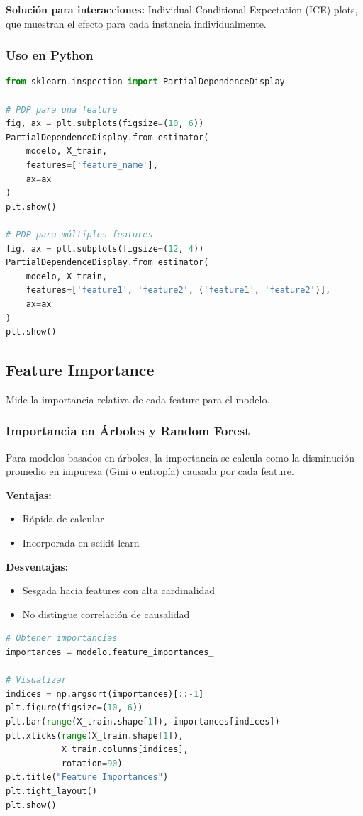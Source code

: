 \documentclass[11pt,a4paper]{article}
\begin{document}
\textbf{Solución para interacciones:} Individual Conditional Expectation (ICE) plots, que muestran el efecto para cada instancia individualmente.

\subsubsection{Uso en Python}

\begin{lstlisting}[language=Python]
from sklearn.inspection import PartialDependenceDisplay

# PDP para una feature
fig, ax = plt.subplots(figsize=(10, 6))
PartialDependenceDisplay.from_estimator(
    modelo, X_train, 
    features=['feature_name'],
    ax=ax
)
plt.show()

# PDP para múltiples features
fig, ax = plt.subplots(figsize=(12, 4))
PartialDependenceDisplay.from_estimator(
    modelo, X_train, 
    features=['feature1', 'feature2', ('feature1', 'feature2')],
    ax=ax
)
plt.show()
\end{lstlisting}

\subsection{Feature Importance}

Mide la importancia relativa de cada feature para el modelo.

\subsubsection{Importancia en Árboles y Random Forest}

Para modelos basados en árboles, la importancia se calcula como la disminución promedio en impureza (Gini o entropía) causada por cada feature.

\textbf{Ventajas:}
\begin{itemize}
\item Rápida de calcular
\item Incorporada en scikit-learn
\end{itemize}

\textbf{Desventajas:}
\begin{itemize}
\item Sesgada hacia features con alta cardinalidad
\item No distingue correlación de causalidad
\end{itemize}

\begin{lstlisting}[language=Python]
# Obtener importancias
importances = modelo.feature_importances_

# Visualizar
indices = np.argsort(importances)[::-1]
plt.figure(figsize=(10, 6))
plt.bar(range(X_train.shape[1]), importances[indices])
plt.xticks(range(X_train.shape[1]), 
           X_train.columns[indices], 
           rotation=90)
plt.title("Feature Importances")
plt.tight_layout()
plt.show()
\end{lstlisting}
\end{document}
